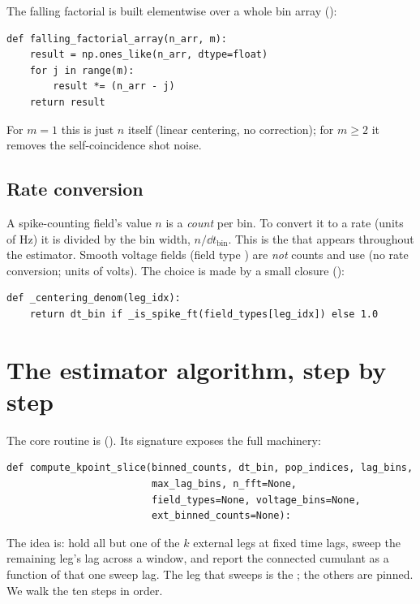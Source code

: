 The falling factorial is built elementwise over a whole bin array
():

\begin{lstlisting}
def falling_factorial_array(n_arr, m):
    result = np.ones_like(n_arr, dtype=float)
    for j in range(m):
        result *= (n_arr - j)
    return result
\end{lstlisting}

For $m=1$ this is just $n$ itself (linear centering, no correction); for $m \ge 2$
it removes the self-coincidence shot noise.

\subsection{Rate conversion}

A spike-counting field's value $n$ is a \emph{count} per bin. To convert it to a
rate (units of Hz) it is divided by the bin width, $n/\dd t_{\mathrm{bin}}$. This is
the  that appears throughout the estimator. Smooth voltage
fields (field type ) are \emph{not} counts and use 
(no rate conversion; units of volts). The choice is made by a small closure
():

\begin{lstlisting}
def _centering_denom(leg_idx):
    return dt_bin if _is_spike_ft(field_types[leg_idx]) else 1.0
\end{lstlisting}

\section{The estimator algorithm, step by step}

The core routine is 
(). Its signature exposes the full machinery:

\begin{lstlisting}
def compute_kpoint_slice(binned_counts, dt_bin, pop_indices, lag_bins,
                         max_lag_bins, n_fft=None,
                         field_types=None, voltage_bins=None,
                         ext_binned_counts=None):
\end{lstlisting}

The idea is: hold all but one of the $k$ external legs at fixed time lags, sweep
the remaining leg's lag across a window, and report the connected cumulant as a
function of that one sweep lag. The leg that sweeps is the ; the
others are pinned. We walk the ten steps in order.

